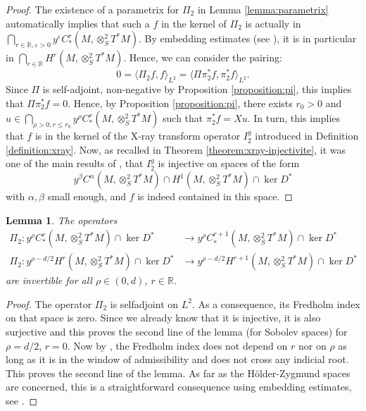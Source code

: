 \documentclass[JEP,XML,SOM,Unicode,NoFloatCountersInSection]{cedram}
\newcommand{\R}{\mathbb{R}}
\newcommand{\eps}{\varepsilon}
\theoremstyle{plain}
\newtheorem{lemma}{Lemma}[section]
\theoremstyle{definition}
\begin{document}
\begin{proof}
The existence of a parametrix for $\Pi_2$ in Lemma \ref{lemma:parametrix} automatically implies that such a $f$ in the kernel of $\Pi_2$ is actually in $\bigcap_{r \in \R, \eps > 0} y^\eps C^r_*(M,\otimes^2_S T^*M)$. By embedding estimates (see \cite[Lem.\,2.1]{Bonthonneau-Lefeuvre-19-1}), it is in particular in $\bigcap_{r \in \R} H^r(M,\otimes^2_S T^*M)$. Hence, we can consider the pairing:
\[
0 = \langle \Pi_2f ,f \rangle_{L^2} = \langle \Pi \pi_2^*f, \pi_2^*f \rangle_{L^2}.
\]
Since $\Pi$ is self-adjoint, non-negative by Proposition \ref{proposition:pi}, this implies that $\Pi \pi_2^*f = 0$. Hence, by Proposition \ref{proposition:pi}, there exists $r_0>0$ and $u\in \bigcap_{\rho>0,r\leq r_0}y^\rho C^r_*(M,\otimes^2_S T^*M)$ such that $\pi_2^*f = Xu$. In turn, this implies that $f$ is in the kernel of the X-ray transform operator $I_2^g$ introduced in Definition \ref{definition:xray}. Now, as recalled in Theorem \ref{theorem:xray-injectivite}, it was one of the main results of \cite[Th.\,1]{Bonthonneau-Lefeuvre-19-1}, that $I_2^g$ is injective on spaces of the form
\[
y^\beta C^\alpha(M, \otimes^2_S T^*M) \cap H^1(M, \otimes^2_S T^*M) \cap \ker D^*
\]
with $\alpha, \beta$ small enough, and $f$ is indeed contained in this space.
\end{proof}

\begin{lemma}
The operators
\[
\begin{split}
\Pi_2 : y^\rho C^r_*(M,\otimes^2_S T^*M) \cap \ker D^* &\to y^\rho C^{r+1}_*(M,\otimes^2_S T^*M) \cap \ker D^*\\
\Pi_2 : y^{\rho-d/2} H^r(M,\otimes^2_S T^*M) \cap \ker D^* &\to y^{\rho-d/2} H^{r+1}(M,\otimes^2_S T^*M) \cap \ker D^*
\end{split}
\]
are invertible for all $\rho \in (0,d)$, $r \in \R$.
\end{lemma}

\begin{proof}
The operator $\Pi_2$ is selfadjoint on $L^2$. As a consequence, its Fredholm index on that space is zero. Since we already know that it is injective, it is also surjective and this proves the second line of the lemma (\ie for Sobolev spaces) for $\rho=d/2$, $r = 0$. Now by \cite[Prop.\,4.6]{Bonthonneau-Lefeuvre-19-1}, the Fredholm index does not depend on $r$ nor on $\rho$ as long as it is in the window of admissibility and does not cross any indicial root. This proves the second line of the lemma. As far as the Hölder-Zygmund spaces are concerned, this is a straightforward consequence using embedding estimates, see \cite[Prop.\,4.9]{Bonthonneau-Lefeuvre-19-1}.
\end{proof}
\end{document}
